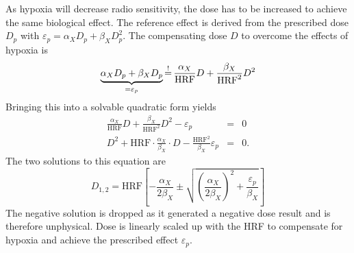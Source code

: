 %
As hypoxia will decrease radio sensitivity, the dose has to be increased to achieve the same biological effect. The reference effect is derived from the prescribed dose $D_p$ with $\varepsilon_p = \alpha_X D_p + \beta_X D_p^2$. The compensating dose $D$ to overcome the effects of hypoxia is
\begin{equation}
\underbrace{\alpha_X D_p + \beta_X D_p}_{=\varepsilon_p} \mathop{=}\limits^! \frac{\alpha_X}{\mathrm{HRF}} D + \frac{\beta_X}{\mathrm{HRF}^2} D^2\\
\end{equation}
Bringing this into a solvable quadratic form yields
\begin{eqnarray}
\frac{\alpha_X}{\mathrm{HRF}} D + \frac{\beta_X}{\mathrm{HRF}^2} D^2 - \varepsilon_p  &=& 0\\
D^2 + \mathrm{HRF}\cdot\frac{\alpha_X}{\beta_X}\cdot D - \frac{\mathrm{HRF}^2}{\beta_X}\varepsilon_p &=& 0.
\end{eqnarray}
The two solutions to this equation are
\begin{equation}
D_{1,2} = \mathrm{HRF}\left[-\frac{\alpha_X}{2\beta_X} \pm \sqrt{\left(\frac{\alpha_X}{2\beta_X}\right)^2 + \frac{\varepsilon_p}{\beta_X}}\right]
\end{equation}
The negative solution is dropped as it generated a negative dose result and is therefore unphysical. Dose is linearly scaled up with the HRF to compensate for hypoxia and achieve the prescribed effect $\varepsilon_p$. 